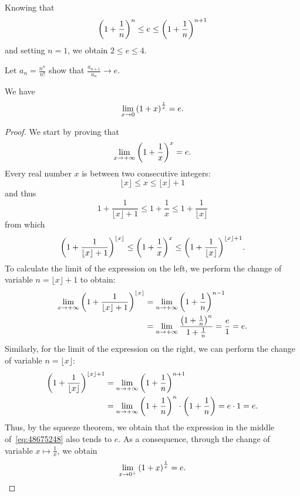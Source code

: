 Knowing that
\[
  {\left( 1+\frac 1 n \right)}^n \le e \le {\left( 1+\frac 1 n \right)}^{n+1}
\]
and setting $n=1$, we obtain $2\le e \le 4$.

\begin{exercise}\label{ex:4876765}
Let $a_n = \frac{n^n}{n!}$ show that $\frac{a_{n+1}}{a_n} \to e$.
\end{exercise}


\begin{theorem}
%
We have 
\[
\lim_{x\to 0}  {\left( 1 + x \right)}^{\frac 1 {x}} = e.
\]
\end{theorem}
%
\begin{proof}
  We start by proving that 
  \begin{equation}\label{eq:2373793}
    \lim_{x\to +\infty} {\left( 1+\frac 1 x \right)}^x = e.
  \end{equation}
  Every real number $x$ is between two consecutive integers:
  \[
      \lfloor x \rfloor \le x \le \lfloor x\rfloor + 1
  \]
  and thus
  \[
    1+\frac{1}{\lfloor x\rfloor +1 } 
    \le 1 + \frac 1 x 
    \le 1 + \frac 1 {\lfloor x\rfloor} 
  \]
  from which 
  \begin{equation}\label{eq:48675248}
    {\left( 1+\frac{1}{\lfloor x\rfloor +1 } \right)}^{\lfloor x\rfloor} 
    \le {\left( 1 + \frac 1 x  \right)}^x
    \le {\left( 1 + \frac 1 {\lfloor x\rfloor} \right)}^{\lfloor x\rfloor +1}. 
  \end{equation}
  To calculate the limit of the expression on the left, 
  we perform the change of variable $n=\lfloor x\rfloor + 1$ to 
  obtain:
  \begin{align*}
  \lim_{x\to+\infty} {\left( 1+\frac{1}{\lfloor x\rfloor +1 } \right)}^{\lfloor x\rfloor}
  &= \lim_{n\to +\infty} {\left( 1+\frac 1 n \right)}^{n-1}\\
  &= \lim_{n\to +\infty} \frac{{\left( 1+\frac 1 n \right)}^{n}}{1+\frac 1 n}
   = \frac{e}{1} = e.
  \end{align*}
  Similarly, for the limit of the expression on the right, 
  we can perform the change of variable $n=\lfloor x\rfloor$:
  \begin{align*}
    {\left( 1 + \frac 1 {\lfloor x\rfloor} \right)}^{\lfloor x\rfloor +1}
    &= \lim_{n\to+\infty} {\left( 1+\frac 1 n \right)}^{n+1} \\
    &= \lim_{n\to+\infty} {\left( 1+\frac 1 n \right)}^n 
    \cdot {\left( 1 + \frac 1 n \right)} 
    = e \cdot 1 = e.
  \end{align*}
  Thus, by the squeeze theorem, we obtain
  that the expression 
  in the middle of~\eqref{eq:48675248} also tends to $e$.
  As a consequence, through the change of variable $x\mapsto \frac 1 x$,
  we obtain 
  \[
  \lim_{x\to 0^+}{\left( 1+x \right)}^{\frac 1 x} = e.  
  \]


\end{proof}
